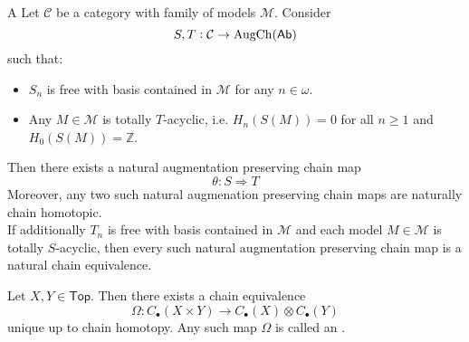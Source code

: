 \begin{theorem}
	A\label{thm:AAMT}
	Let $\mathcal{C}$ be a category with family of models $\mathcal{M}$. Consider
	\begin{equation*}
		S,T : \mathcal{C} \to \operatorname{AugCh}(\mathsf{Ab})
	\end{equation*}
	\noindent such that:
	\begin{itemize}
		\item $S_n$ is free with basis contained in $\mathcal{M}$ for any $n \in \omega$.
		\item Any $M \in \mathcal{M}$ is totally $T$-acyclic, i.e. $H_n(S(M)) = 0$ for all $n \geq 1$ and $H_0(S(M)) = \mathbb{Z}$.
	\end{itemize}
	Then there exists a natural augmentation preserving chain map
	\begin{equation*}
		\theta : S \Rightarrow T
	\end{equation*}
	Moreover, any two such natural augmenation preserving chain maps are naturally chain homotopic.\\
	If additionally $T_n$ is free with basis contained in $\mathcal{M}$ and each model $M \in \mathcal{M}$ is totally $S$-acyclic, then every such natural augmentation preserving chain map is a natural chain equivalence.
\end{theorem}

\begin{theorem}
	Let $X,Y \in \mathsf{Top}$. Then there exists a chain equivalence
	\begin{equation*}
		\Omega : C_\bullet(X \times Y) \to C_\bullet(X) \otimes C_\bullet(Y)
	\end{equation*}
	\noindent unique up to chain homotopy. Any such map $\Omega$ is called an .
\end{theorem}

